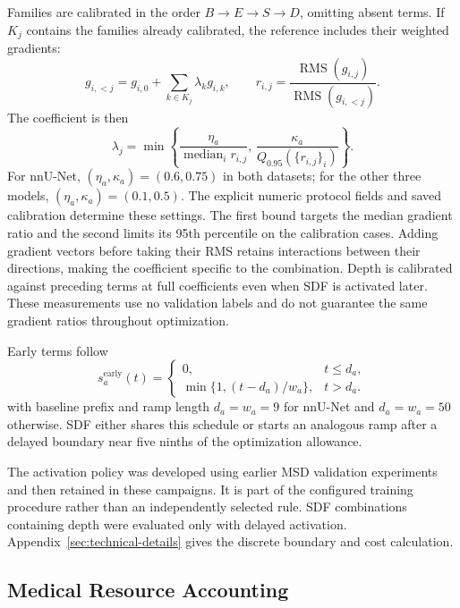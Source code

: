 \documentclass[12pt,a4paper]{article}
\begin{document}
Families are calibrated in the order $B\to E\to S\to D$, omitting
absent terms. If $K_j$ contains the families already calibrated, the
reference includes their weighted gradients:
\begin{equation}
g_{i,<j}=g_{i,0}+\sum_{k\in K_j}\lambda_k g_{i,k},
\qquad
r_{i,j}=\frac{\operatorname{RMS}(g_{i,j})}
                  {\operatorname{RMS}(g_{i,<j})}.
\label{eq:sequential-calibration-ratio}
\end{equation}
The coefficient is then
\begin{equation}
\lambda_j=
\min\left\{
\frac{\eta_a}{\operatorname{median}_i r_{i,j}},\,
\frac{\kappa_a}{Q_{0.95}(\{r_{i,j}\}_i)}
\right\}.
\label{eq:constraint-calibrated-coefficient}
\end{equation}
For nnU-Net, $(\eta_a,\kappa_a)=(0.6,0.75)$ in both datasets;
for the other three models, $(\eta_a,\kappa_a)=(0.1,0.5)$. The explicit
numeric protocol fields and saved calibration determine these settings.
The first bound targets the median gradient ratio and the second
limits its 95th percentile on the calibration cases. Adding gradient vectors
before taking their RMS retains interactions between their directions,
making the coefficient specific to the combination. Depth is calibrated
against preceding terms at full coefficients even when SDF is activated
later. These measurements use no validation labels and do not guarantee
the same gradient ratios throughout optimization.

Early terms follow
\begin{equation}
s_a^{\mathrm{early}}(t)=
\begin{cases}
0, & t\leq d_a,\\
\min\{1,(t-d_a)/w_a\}, & t>d_a.
\end{cases}
\label{eq:constraint-early-ramp}
\end{equation}
with baseline prefix and ramp length $d_a=w_a=9$ for nnU-Net and
$d_a=w_a=50$ otherwise. SDF either shares this schedule or starts an
analogous ramp after a delayed boundary near five ninths of the
optimization allowance.


The activation policy was developed using earlier MSD validation
experiments and then retained in these campaigns. It is part of the
configured training procedure rather than an independently selected rule. SDF
combinations containing depth were evaluated only with delayed activation.
Appendix~\ref{sec:technical-details} gives the discrete boundary and
cost calculation.

\subsection{Medical Resource Accounting}\label{sec:detailed-resource-accounting}
\end{document}
